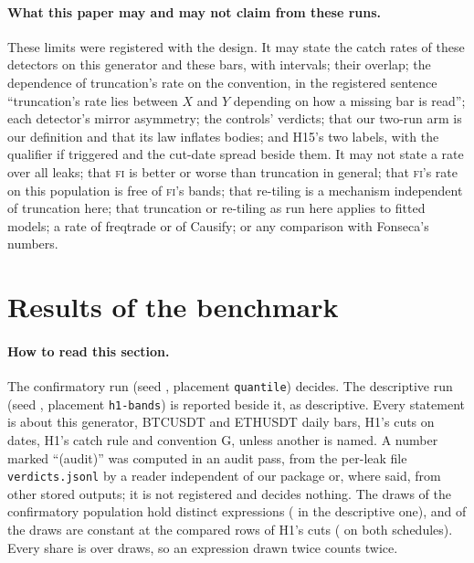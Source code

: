 \documentclass[11pt]{article}
\newcommand{\code}[1]{\texttt{#1}}
\newcommand{\FI}{\textsc{fi}}
\begin{document}
\paragraph{What this paper may and may not claim from these runs.}\label{sec:prereg-claims}
These limits were registered with the design. It may state the catch rates of these detectors on this generator and
these bars, with intervals; their overlap; the dependence of truncation's rate on the convention,
in the registered sentence ``truncation's rate lies between $X$ and $Y$ depending on how a missing
bar is read''; each detector's mirror asymmetry; the controls' verdicts; that our two-run arm is our
definition and that its law inflates bodies; and H15's two labels, with the qualifier if triggered
and the cut-date spread beside them. It may not state a rate over all leaks; that \FI{} is better or
worse than truncation in general; that \FI's rate on this population is free of \FI's bands; that
re-tiling is a mechanism independent of truncation here; that truncation or re-tiling as run here
applies to fitted models; a rate of freqtrade or of Causify; or any comparison with Fonseca's
numbers.

\section{Results of the benchmark}\label{sec:results}

\paragraph{How to read this section.} The confirmatory run (seed \NumConfSeed, placement
\code{quantile}) decides. The descriptive run (seed \NumDescSeed, placement \code{h1-bands}) is
reported beside it, as descriptive. Every statement is about this generator, BTCUSDT and ETHUSDT
daily bars, H1's \NumHoneCutsN{} cuts on \NumCutDates{} dates, H1's catch rule and convention G,
unless another is named. A number marked ``(audit)'' was computed in an audit pass, from the
per-leak file \code{verdicts.jsonl} by a reader independent of our package or, where said, from
other stored outputs; it is not registered and decides nothing.
The \NumPopN{} draws of the confirmatory population hold \NumCDistinct{} distinct expressions
(\NumDDistinct{} in the descriptive one), and \NumCConstH{} of the draws are constant at the
compared rows of H1's cuts (\NumCConstBoth{} on both schedules). Every share is over draws, so an
expression drawn twice counts twice.
\end{document}
